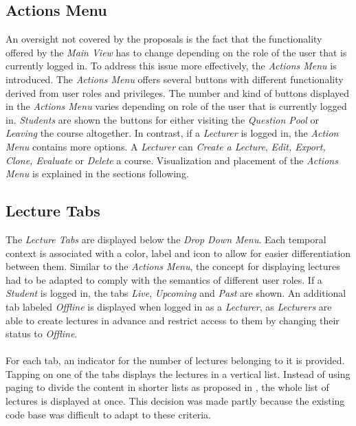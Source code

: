 \subsection{Actions Menu}
An oversight not covered by the proposals is the fact that the functionality offered by the \emph{Main View} has to change depending on the role of the user that is currently logged in. To address this issue more effectively, the \emph{Actions Menu} is introduced.
The \emph{Actions Menu} offers several buttons with different functionality derived from user roles and privileges.
The number and kind of buttons displayed in the \emph{Actions Menu} varies depending on role of the user that is currently logged in. \emph{Students} are shown the buttons for either visiting the \emph{Question Pool} or \emph{Leaving} the course altogether. In contrast, if a \emph{Lecturer} is logged in, the \emph{Action Menu} contains more options. A \emph{Lecturer} can \emph{Create a Lecture}, \emph{Edit, Export, Clone, Evaluate } or \emph{Delete} a course. Visualization and placement of the \emph{Actions Menu} is explained in the sections following.


\subsection{Lecture Tabs}
The \emph{Lecture Tabs} are displayed below the \emph{Drop Down Menu}. Each temporal context is associated with a color, label and icon to allow for easier differentiation between them. Similar to the \emph{Actions Menu}, the concept for displaying lectures had to be adapted to comply with the semantics of different user roles.
If a \emph{Student} is logged in, the tabs \emph{Live}, \emph{Upcoming} and \emph{Past} are shown. An additional tab labeled \emph{Offline} is displayed when logged in as a \emph{Lecturer}, as \emph{Lecturers} are able to create lectures in advance and restrict access to them by changing their status to \emph{Offline}.
\\
\\
For each tab, an indicator for the number of lectures belonging to it is provided.
Tapping on one of the tabs displays the lectures in a vertical list. Instead of using paging to divide the content in shorter lists as proposed in , the whole list of lectures is displayed at once.
This decision was made partly because the existing code base was difficult to adapt to these criteria.

